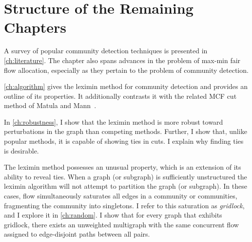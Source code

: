 %
%

\section{Structure of the Remaining Chapters}

A survey of popular community detection techniques is presented in \autoref{ch:literature}. The chapter also spans advances in the problem of max-min fair flow allocation, especially as they pertain to the problem of community detection.

\autoref{ch:algorithm} gives the leximin method for community detection and provides an outline of its properties. It additionally contrasts it with the related MCF cut method of Matula and Mann~\cite{mann2008extensions, matula1985concurrent}.

In \autoref{ch:robustness}, I show that the leximin method is more robust toward perturbations in the graph than competing methods. Further, I show that, unlike popular methods, it is capable of showing ties in cuts. I explain why finding ties is desirable.

The leximin method possesses an unusual property, which is an extension of its ability to reveal ties. When a graph (or subgraph) is sufficiently unstructured the leximin algorithm will not attempt to partition the graph (or subgraph). In these cases, flow simultaneously saturates all edges in a community or communities, fragmenting the community into singletons. I refer to this saturation as \emph{gridlock}, and I explore it in \autoref{ch:random}. I show that for every graph that exhibits gridlock, there exists an unweighted multigraph with the same concurrent flow assigned to edge-disjoint paths between all pairs.

